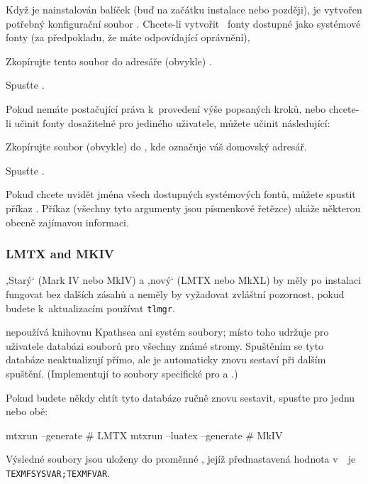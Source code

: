 \documentclass[\classoptions,slovak,english,czech]{\classname}
\newcommand{\singleuv}[1]{,#1`}
\begin{document}
Když je nainstalován balíček  (buď na začátku
instalace nebo později), je vytvořen potřebný konfigurační soubor
. Chcete-li vytvořit
\TL\ fonty dostupné jako systémové fonty (za předpokladu, že máte odpovídající oprávnění),
\begin{enumerate*}
\item Zkopírujte tento soubor  do adresáře (obvykle)
.
\item Spusťte .
\end{enumerate*}
Pokud nemáte postačující práva k~provedení výše popsaných kroků,
nebo chcete-li učinit fonty \TL{} dosažitelné pro jediného uživatele, 
můžete učinit následující:
\begin{enumerate*}
\item Zkopírujte soubor  (obvykle) do
  , kde \filename{~} označuje váš 
  domovský adresář.
\item Spusťte .
\end{enumerate*}

Pokud chcete uvidět jména všech dostupných systémových fontů, můžete 
spustit příkaz .  
Příkaz  
(všechny tyto argumenty jsou písmenkové řetězce) 
ukáže některou obecně zajímavou informaci.


\subsubsection{\protect\ConTeXt{} LMTX and MKIV}
\label{sec:context}
\label{sec:context_mkiv}

\singleuv{Starý} \ConTeXt{} (Mark IV nebo MkIV) a \singleuv{nový} \ConTeXt{}
(LMTX nebo MkXL) by měly po instalaci \TL{} fungovat bez dalších zásahů
a neměly by vyžadovat zvláštní pozornost, pokud budete k~aktualizacím 
používat \verb+tlmgr+.

\ConTeXt{} nepoužívá knihovnu Kpathsea ani systém 
soubory; místo toho \ConTeXt{} udržuje pro uživatele databázi souborů
pro všechny známé stromy. Spuštěním  se tyto databáze neaktualizují
přímo, ale \ConTeXt{} je automaticky znovu sestaví
při dalším spuštění. (Implementují to soubory specifické pro \TL {} a
.)

Pokud budete někdy chtít tyto databáze ručně znovu sestavit, spusťte pro jednu nebo obě:
\begin{sverbatim}
mtxrun --generate           # LMTX
mtxrun --luatex --generate  # MkIV
\end{sverbatim}
Výsledné soubory jsou uloženy do proměnné ,
jejíž přednastavená hodnota v~\TL\ je \verb+TEXMFSYSVAR;TEXMFVAR+. 
\end{document}
